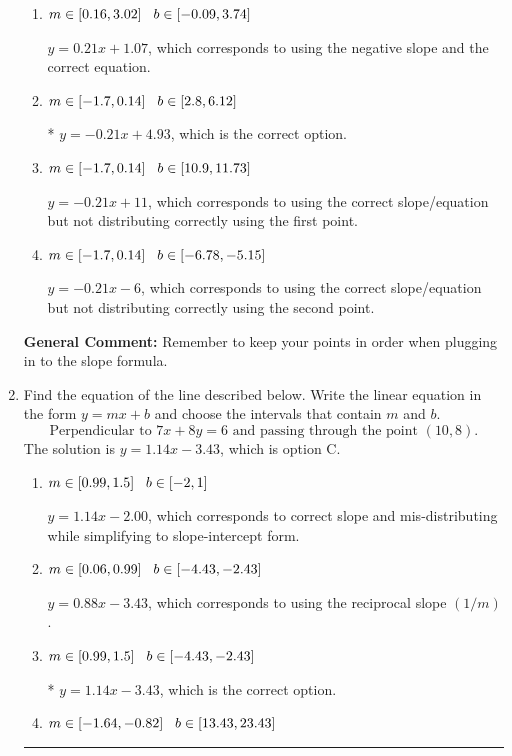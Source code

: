 \documentclass{extbook}[14pt]
\newcommand{\litem}[1]{\item #1

\rule{\textwidth}{0.4pt}}
\begin{document}
\begin{enumerate}
{\begin{enumerate}[label=\Alph*.]
 $y = -0.21x -4.93$, which corresponds to using the correct slope and getting the negative y-intercept.
\item \( m \in [0.16, 3.02] \hspace*{3mm} b \in [-0.09, 3.74] \)

 $y = 0.21x + 1.07$, which corresponds to using the negative slope and the correct equation.
\item \( m \in [-1.7, 0.14] \hspace*{3mm} b \in [2.8, 6.12] \)

* $y = -0.21x + 4.93$, which is the correct option.
\item \( m \in [-1.7, 0.14] \hspace*{3mm} b \in [10.9, 11.73] \)

 $y = -0.21x + 11$, which corresponds to using the correct slope/equation but not distributing correctly using the first point.
\item \( m \in [-1.7, 0.14] \hspace*{3mm} b \in [-6.78, -5.15] \)

 $y = -0.21x -6$, which corresponds to using the correct slope/equation but not distributing correctly using the second point.
\end{enumerate}

\textbf{General Comment:} Remember to keep your points in order when plugging in to the slope formula.
}
\litem{
Find the equation of the line described below. Write the linear equation in the form $ y=mx+b $ and choose the intervals that contain $m$ and $b$.
\[ \text{Perpendicular to } 7 x + 8 y = 6 \text{ and passing through the point } (10, 8). \]The solution is \( y = 1.14x - 3.43 \), which is option C.\begin{enumerate}[label=\Alph*.]
\item \( m \in [0.99, 1.5] \hspace*{3mm} b \in [-2, 1] \)

 $y = 1.14x - 2.00$, which corresponds to correct slope and mis-distributing while simplifying to slope-intercept form.
\item \( m \in [0.06, 0.99] \hspace*{3mm} b \in [-4.43, -2.43] \)

 $y = 0.88x - 3.43$, which corresponds to using the reciprocal slope $(1/m)$.
\item \( m \in [0.99, 1.5] \hspace*{3mm} b \in [-4.43, -2.43] \)

* $y = 1.14x - 3.43$, which is the correct option.
\item \( m \in [-1.64, -0.82] \hspace*{3mm} b \in [13.43, 23.43] \)


\end{enumerate}}
\end{enumerate}
\end{document}
